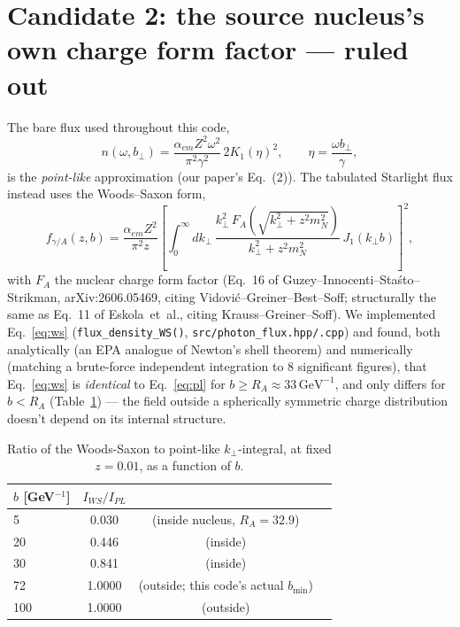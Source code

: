 \documentclass[11pt]{article}
\begin{document}
\section{Candidate 2: the source nucleus's own charge form factor --- ruled out}

The bare flux used throughout this code,
\begin{equation}
n(\omega,b_\perp)=\frac{\alpha_{em}Z^2\omega^2}{\pi^2\gamma^2}\,2K_1(\eta)^2,
\qquad \eta=\frac{\omega b_\perp}{\gamma},
\label{eq:pl}
\end{equation}
is the \emph{point-like} approximation (our paper's Eq.~(2)). The
tabulated Starlight flux instead uses the Woods--Saxon form,
\begin{equation}
f_{\gamma/A}(z,b)=\frac{\alpha_{em}Z^2}{\pi^2 z}\left[\int_0^\infty dk_\perp\,
\frac{k_\perp^2\,F_A\!\left(\sqrt{k_\perp^2+z^2m_N^2}\right)}{k_\perp^2+z^2m_N^2}\,
J_1(k_\perp b)\right]^2,
\label{eq:ws}
\end{equation}
with $F_A$ the nuclear charge form factor (Eq.~16 of Guzey--Innocenti--Sta\'sto--Strikman,
arXiv:2606.05469, citing Vidovi\'c--Greiner--Best--Soff; structurally the
same as Eq.~11 of Eskola~et~al., citing Krauss--Greiner--Soff). We
implemented Eq.~\eqref{eq:ws} (\texttt{flux\_density\_WS()},
\texttt{src/photon\_flux.hpp/.cpp}) and found, both analytically (an
EPA analogue of Newton's shell theorem) and numerically (matching a
brute-force independent integration to 8 significant figures), that
Eq.~\eqref{eq:ws} is \emph{identical} to Eq.~\eqref{eq:pl} for
$b\ge R_A\approx33\,\text{GeV}^{-1}$, and only differs for $b<R_A$
(Table~\ref{tab:shell}) --- the field outside a spherically symmetric
charge distribution doesn't depend on its internal structure.

\begin{table}[h]
\centering
\begin{tabular}{lccc}
\hline
$b$ [GeV$^{-1}$] & $I_{WS}/I_{PL}$ & \\
\hline
5   & 0.030 & (inside nucleus, $R_A=32.9$) \\
20  & 0.446 & (inside) \\
30  & 0.841 & (inside) \\
72  & 1.0000 & (outside; this code's actual $b_{\min}$) \\
100 & 1.0000 & (outside) \\
\hline
\end{tabular}
\caption{Ratio of the Woods-Saxon to point-like $k_\perp$-integral, at fixed
$z=0.01$, as a function of $b$.}
\label{tab:shell}
\end{table}
\end{document}
